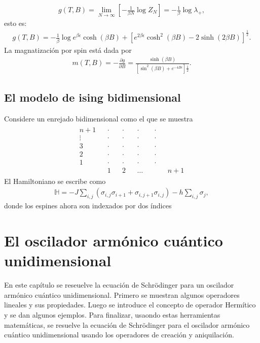 \documentclass[letterpaper,12pt,oneside]{book}
\begin{document}
%
\begin{eqnarray}
g(T,B)=\lim_{N\to\infty}\left[-\frac{1}{\beta N}\log Z_N\right]=-\frac{1}{\beta}\log\lambda_{+},
\end{eqnarray}
%
esto es:
%
\begin{eqnarray}
g(T,B)=-\frac{1}{\beta}\log{e^{\beta \epsilon} \cosh(\beta B) + \left[e^{2\beta \epsilon } \cosh^2 (\beta B) - 2\sinh (2\beta B)\right]^{\frac{1}{2}}}.
\end{eqnarray}
%
La magnatizaci\'on por spin est\'a dada por 
%
\begin{eqnarray}
m(T,B)=-\frac{\partial g}{\partial B} = \frac{\sinh(\beta B)}{[\sin^2(\beta B)+ e^{-4 B\epsilon}]\frac{1}{2}}.
\end{eqnarray}
%
\section{El modelo de ising bidimensional}
Considere un enrejado bidimensional como el que se muestra\\
%
\begin{eqnarray}
\begin{matrix}
n+1 && \cdot && \cdot && \cdot && \cdot  \\
\vdots && \cdot && \cdot && \cdot && \cdot  \\
3 && \cdot && \cdot && \cdot && \cdot  \\
2 && \cdot && \cdot && \cdot && \cdot  \\
1 && \cdot && \cdot && \cdot && \cdot  \\
 &&1 && 2 &&   \dots&&  && n+1
\end{matrix} \nonumber
\end{eqnarray}
El Hamiltoniano se escribe como 
\begin{eqnarray}
\mathbb{H}= -J \sum_{i,j} (\sigma_{i,j}\sigma_{i+1}+\sigma_{i,j+1}\sigma_{i,j}) - h \sum_{i,j}\sigma_{j},
\end{eqnarray}
donde los espines ahora son indexados por dos índices 
 


















\chapter{El oscilador arm\'onico cu\'antico unidimensional}
%
En este cap\'itulo se reseuelve la ecuaci\'on de Schr\"odinger para un oscilador arm\'onico cu\'antico unidimensional. Primero se muestran algunos operadores lineales y sus propiedades. Luego se introduce el concepto de operador Herm\'itico y se dan algunos ejemplos. Para finalizar, usaondo estas herramientas matem\'aticas, se resuelve la ecuaci\'on de Schr\"odinger para el oscilador arm\'onico cu\'antico unidimensional usando los operadores de creaci\'on y aniquilaci\'on.
\end{document}
